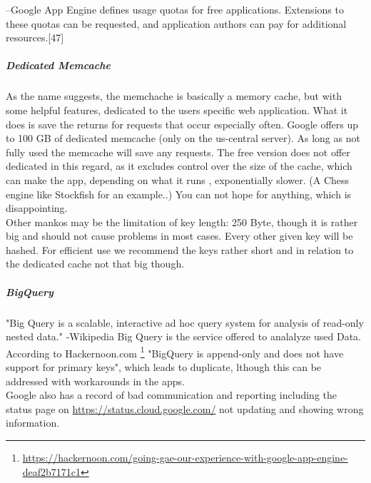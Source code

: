 \documentclass{article}
\begin{document}
--Google App Engine defines usage quotas for free applications. Extensions to these quotas can be requested, and application authors can pay for additional resources.[47]

\subparagraph{Dedicated Memcache}
 As the name suggests, the memchache is basically a memory cache, but with some helpful features, dedicated to the users specific web application. What it does is save the returns for requests that occur especially often. Google offers up to 100 GB of dedicated memcache (only on the us-central server). As long as not fully used the memcache will save any requests. The free version does not offer dedicated in this regard, as it excludes control over the size of the cache, which can make the app, depending on what it runs , exponentially slower. (A Chess engine like Stockfish for an example..) You can not hope for anything, which is disappointing.  \\
 Other mankos may be the limitation of key length: 250 Byte, though it is rather big and should not cause problems in most cases. Every other given key will be hashed. For efficient use we recommend the keys rather short and in relation to the dedicated cache not that big though. 
 
 \subparagraph{BigQuery}
 "Big Query is a scalable, interactive ad hoc query system for analysis of read-only nested data." -Wikipedia 
 Big Query is the service offered to analalyze used Data. According to Hackernoon.com \footnote{\url{https://hackernoon.com/going-gae-our-experience-with-google-app-engine-deaf2b7171c1}} "BigQuery is append-only and does not have support for primary keys", which leads to duplicate, lthough this can be addressed with workarounds in the apps. \\
 Google also has a record of bad communication and reporting including the status page on \url{https://status.cloud.google.com/} not updating and showing wrong information. 
\end{document}

